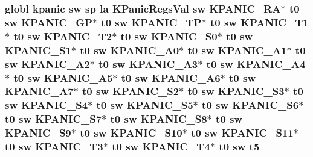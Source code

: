 \hypertarget{riscv_2kpanica_8S_a8091cb6f0cf3eda5fe8ed366e78cd0d5}{
\subsubsection[{t5}]{\setlength{\rightskip}{0pt plus 5cm}globl {\bf kpanic} {\bf sw} {\bf sp} {\bf la} {\bf K\-Panic\-Regs\-Val} {\bf sw} {\bf K\-P\-A\-N\-I\-C\-\_\-\-R\-A}$\ast$ {\bf t0} {\bf sw} {\bf K\-P\-A\-N\-I\-C\-\_\-\-G\-P}$\ast$ {\bf t0} {\bf sw} {\bf K\-P\-A\-N\-I\-C\-\_\-\-T\-P}$\ast$ {\bf t0} {\bf sw} {\bf K\-P\-A\-N\-I\-C\-\_\-\-T1}$\ast$ {\bf t0} {\bf sw} {\bf K\-P\-A\-N\-I\-C\-\_\-\-T2}$\ast$ {\bf t0} {\bf sw} {\bf K\-P\-A\-N\-I\-C\-\_\-\-S0}$\ast$ {\bf t0} {\bf sw} {\bf K\-P\-A\-N\-I\-C\-\_\-\-S1}$\ast$ {\bf t0} {\bf sw} {\bf K\-P\-A\-N\-I\-C\-\_\-\-A0}$\ast$ {\bf t0} {\bf sw} {\bf K\-P\-A\-N\-I\-C\-\_\-\-A1}$\ast$ {\bf t0} {\bf sw} {\bf K\-P\-A\-N\-I\-C\-\_\-\-A2}$\ast$ {\bf t0} {\bf sw} {\bf K\-P\-A\-N\-I\-C\-\_\-\-A3}$\ast$ {\bf t0} {\bf sw} {\bf K\-P\-A\-N\-I\-C\-\_\-\-A4}$\ast$ {\bf t0} {\bf sw} {\bf K\-P\-A\-N\-I\-C\-\_\-\-A5}$\ast$ {\bf t0} {\bf sw} {\bf K\-P\-A\-N\-I\-C\-\_\-\-A6}$\ast$ {\bf t0} {\bf sw} {\bf K\-P\-A\-N\-I\-C\-\_\-\-A7}$\ast$ {\bf t0} {\bf sw} {\bf K\-P\-A\-N\-I\-C\-\_\-\-S2}$\ast$ {\bf t0} {\bf sw} {\bf K\-P\-A\-N\-I\-C\-\_\-\-S3}$\ast$ {\bf t0} {\bf sw} {\bf K\-P\-A\-N\-I\-C\-\_\-\-S4}$\ast$ {\bf t0} {\bf sw} {\bf K\-P\-A\-N\-I\-C\-\_\-\-S5}$\ast$ {\bf t0} {\bf sw} {\bf K\-P\-A\-N\-I\-C\-\_\-\-S6}$\ast$ {\bf t0} {\bf sw} {\bf K\-P\-A\-N\-I\-C\-\_\-\-S7}$\ast$ {\bf t0} {\bf sw} {\bf K\-P\-A\-N\-I\-C\-\_\-\-S8}$\ast$ {\bf t0} {\bf sw} {\bf K\-P\-A\-N\-I\-C\-\_\-\-S9}$\ast$ {\bf t0} {\bf sw} {\bf K\-P\-A\-N\-I\-C\-\_\-\-S10}$\ast$ {\bf t0} {\bf sw} {\bf K\-P\-A\-N\-I\-C\-\_\-\-S11}$\ast$ {\bf t0} {\bf sw} {\bf K\-P\-A\-N\-I\-C\-\_\-\-T3}$\ast$ {\bf t0} {\bf sw} {\bf K\-P\-A\-N\-I\-C\-\_\-\-T4}$\ast$ {\bf t0} {\bf sw} t5}}\label{riscv_2kpanica_8S_a8091cb6f0cf3eda5fe8ed366e78cd0d5}
